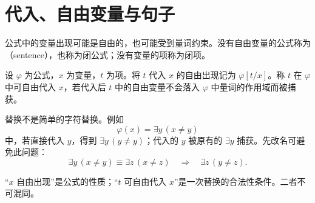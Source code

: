 \section{代入、自由变量与句子}\label{sec:subst}

公式中的变量出现可能是自由的，也可能受到量词约束。没有自由变量的公式称为（sentence），也称为闭公式；没有变量的项称为闭项。

\begin{definition}[可自由代入]
设 $\varphi$ 为公式，$x$ 为变量，$t$ 为项。将 $t$ 代入 $x$ 的自由出现记为 $\varphi[t/x]$。称 $t$ 在 $\varphi$ 中可自由代入 $x$，若代入后 $t$ 中的自由变量不会落入 $\varphi$ 中量词的作用域而被捕获。
\end{definition}

替换不是简单的字符替换。例如
\[
\varphi(x)=\exists y\,(x\neq y)
\]
中，若直接代入 $y$，得到 $\exists y\,(y\neq y)$；代入的 $y$ 被原有的 $\exists y$ 捕获。先改名可避免此问题：
\[
\exists y\,(x\neq y)\equiv\exists z\,(x\neq z)
\quad\Longrightarrow\quad
\exists z\,(y\neq z).
\]

\begin{remark}
“$x$ 自由出现”是公式的性质；“$t$ 可自由代入 $x$”是一次替换的合法性条件。二者不可混同。
\end{remark}
